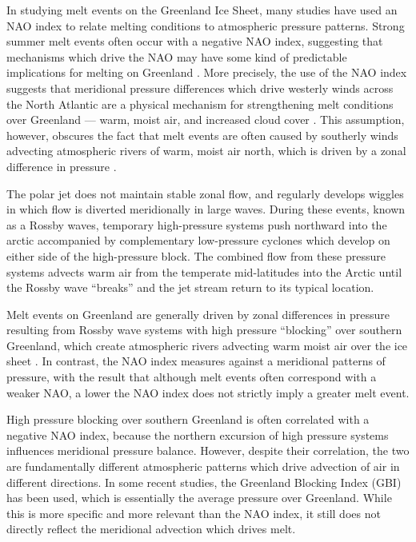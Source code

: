 \documentclass[11pt]{report}
\begin{document}
In studying melt events on the Greenland Ice Sheet, many studies have used an NAO index to relate melting conditions to atmospheric pressure patterns. Strong summer melt events often occur with a negative NAO index, suggesting that mechanisms which drive the NAO may have some kind of predictable implications for melting on Greenland \cite[][]{hanna2013,mattingly2018,mcmillan2016,bevis2019,getraerFall,hahn2018}. More precisely, the use of the NAO index suggests that meridional pressure differences which drive westerly winds across the North Atlantic are a physical mechanism for strengthening melt conditions over Greenland --- warm, moist air, and increased cloud cover \cite[][]{hanna2013,mattingly2018,mcmillan2016,bevis2019,getraerFall,hahn2018}. This assumption, however, obscures the fact that melt events are often caused by southerly winds advecting atmospheric rivers of warm, moist air north, which is driven by a zonal difference in pressure \cite[][]{hanna2013,mattingly2018}.

The polar jet does not maintain stable zonal flow, and regularly develops wiggles in which flow is diverted meridionally in large waves. During these events, known as a Rossby waves, temporary high-pressure systems push northward into the arctic accompanied by complementary low-pressure cyclones which develop on either side of the high-pressure block. The combined flow from these pressure systems advects warm air from the temperate mid-latitudes into the Arctic until the Rossby wave ``breaks'' and the jet stream return to its typical location.

Melt events on Greenland are generally driven by zonal differences in pressure resulting from Rossby wave systems with high pressure ``blocking'' over southern Greenland, which create atmospheric rivers advecting warm moist air over the ice sheet \cite[][]{mattingly2018}. In contrast, the NAO index measures against a meridional patterns of pressure, with the result that although melt events often correspond with a weaker NAO, a lower the NAO index does not strictly imply a greater melt event.

High pressure blocking over southern Greenland is often correlated with a negative NAO index, because the northern excursion of high pressure systems influences meridional pressure balance. However, despite their correlation, the two are fundamentally different atmospheric patterns which drive advection of air in different directions. In some recent studies, the Greenland Blocking Index (GBI) has been used, which is essentially the average pressure over Greenland. While this is more specific and more relevant than the NAO index, it still does not directly reflect the meridional advection which drives melt.
\end{document}
